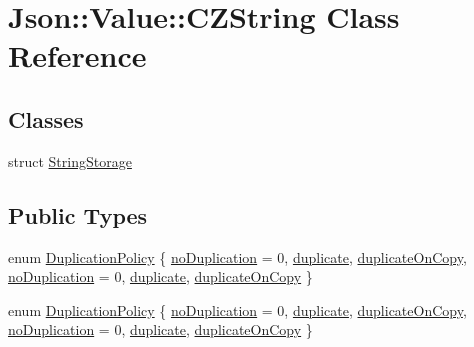 \hypertarget{class_json_1_1_value_1_1_c_z_string}{}\section{Json\+:\+:Value\+:\+:C\+Z\+String Class Reference}
\label{class_json_1_1_value_1_1_c_z_string}
\subsection*{Classes}
\begin{DoxyCompactItemize}
\item 
struct \hyperlink{struct_json_1_1_value_1_1_c_z_string_1_1_string_storage}{String\+Storage}
\end{DoxyCompactItemize}
\subsection*{Public Types}
\begin{DoxyCompactItemize}
\item 
enum \hyperlink{class_json_1_1_value_1_1_c_z_string_a2805c46fb4a72bbaed55de6d75941b6d}{Duplication\+Policy} \{ \newline
\hyperlink{class_json_1_1_value_1_1_c_z_string_a2805c46fb4a72bbaed55de6d75941b6dabe3c3619eac7dc5d5146dbd99007142e}{no\+Duplication} = 0, 
\hyperlink{class_json_1_1_value_1_1_c_z_string_a2805c46fb4a72bbaed55de6d75941b6da9bba1ee215b6afaba961f403fa6605f5}{duplicate}, 
\hyperlink{class_json_1_1_value_1_1_c_z_string_a2805c46fb4a72bbaed55de6d75941b6da7475312715c35dc630985fc2d8ce4095}{duplicate\+On\+Copy}, 
\hyperlink{class_json_1_1_value_1_1_c_z_string_a2805c46fb4a72bbaed55de6d75941b6dabe3c3619eac7dc5d5146dbd99007142e}{no\+Duplication} = 0, 
\newline
\hyperlink{class_json_1_1_value_1_1_c_z_string_a2805c46fb4a72bbaed55de6d75941b6da9bba1ee215b6afaba961f403fa6605f5}{duplicate}, 
\hyperlink{class_json_1_1_value_1_1_c_z_string_a2805c46fb4a72bbaed55de6d75941b6da7475312715c35dc630985fc2d8ce4095}{duplicate\+On\+Copy}
 \}
\item 
enum \hyperlink{class_json_1_1_value_1_1_c_z_string_a2805c46fb4a72bbaed55de6d75941b6d}{Duplication\+Policy} \{ \newline
\hyperlink{class_json_1_1_value_1_1_c_z_string_a2805c46fb4a72bbaed55de6d75941b6dabe3c3619eac7dc5d5146dbd99007142e}{no\+Duplication} = 0, 
\hyperlink{class_json_1_1_value_1_1_c_z_string_a2805c46fb4a72bbaed55de6d75941b6da9bba1ee215b6afaba961f403fa6605f5}{duplicate}, 
\hyperlink{class_json_1_1_value_1_1_c_z_string_a2805c46fb4a72bbaed55de6d75941b6da7475312715c35dc630985fc2d8ce4095}{duplicate\+On\+Copy}, 
\hyperlink{class_json_1_1_value_1_1_c_z_string_a2805c46fb4a72bbaed55de6d75941b6dabe3c3619eac7dc5d5146dbd99007142e}{no\+Duplication} = 0, 
\newline
\hyperlink{class_json_1_1_value_1_1_c_z_string_a2805c46fb4a72bbaed55de6d75941b6da9bba1ee215b6afaba961f403fa6605f5}{duplicate}, 
\hyperlink{class_json_1_1_value_1_1_c_z_string_a2805c46fb4a72bbaed55de6d75941b6da7475312715c35dc630985fc2d8ce4095}{duplicate\+On\+Copy}
 \}
\end{DoxyCompactItemize}
